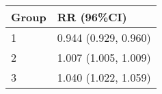 \begin{tabular}{ll}
  \hline
Group & RR (96\%CI) \\ 
  \hline
   1 & 0.944 (0.929, 0.960) \\ 
     2 & 1.007 (1.005, 1.009) \\ 
     3 & 1.040 (1.022, 1.059) \\ 
   \hline
\end{tabular}


